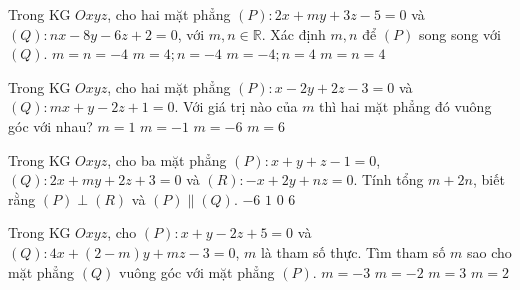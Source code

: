 \begin{ex}%
	Trong KG $Oxyz$, cho hai mặt phẳng $(P)\colon 2x+my+3z-5=0$ và $(Q)\colon nx-8y-6z+2=0$, với $m,n\in \mathbb{R}$. Xác định $m,n$ để $(P)$ song song với $(Q)$.
\choice
{$m=n=-4$}
{\True $m=4;n=-4$}
{$m=- 4;n=4$}
{$m=n=4$}
\end{ex}

\begin{ex}%
	Trong KG $Oxyz$, cho hai mặt phẳng $(P)\colon x-2y+2z-3=0$ và $(Q)\colon mx+y-2z+1=0$. Với giá trị nào của $m$ thì hai mặt phẳng đó vuông góc với nhau?
\choice
{$m=1$}
{$m=-1$}
{$m=-6$}
{\True $m=6$}
\end{ex}

\begin{ex}%
	Trong KG $Oxyz$, cho ba mặt phẳng $(P)\colon x+y+z-1=0$, $(Q)\colon 2x+my+2z+3=0$ và $(R)\colon -x+2y+nz=0$. Tính tổng $m+2n$, biết rằng $(P)\perp (R)$ và $(P)\parallel (Q)$.
\choice
{$-6$}
{$1$}
{\True $0$}
{$6$}
\end{ex}

\begin{ex}%
	Trong KG $Oxyz$, cho $(P)\colon x+y-2z+5=0$ và $(Q)\colon 4x+(2-m)y+mz-3=0$, $m$ là tham số thực. Tìm tham số $m$ sao cho mặt phẳng $(Q)$ vuông góc với mặt phẳng $(P)$.
\choice
{$m=-3$}
{$m=-2$}
{$m=3$}
{\True $m=2$}
\end{ex}

